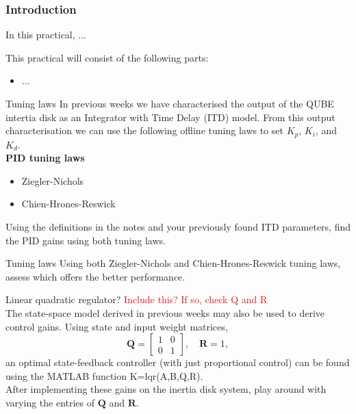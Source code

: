 \documentclass[9pt]{beamer-control}
\begin{document}

\begin{frame}
\frametitle{Introduction}
In this practical, ...

\vfill

This practical will consist of the following parts:
\begin{itemize}
\item ...
\end{itemize}
\end{frame}


\begin{frame}{Tuning laws}
In previous weeks we have characterised the output of the QUBE intertia disk as an Integrator with Time Delay (ITD) model. From this output characterisation we can use the following offline tuning laws to set $K_p$, $K_i$, and $K_d$.\\
\textbf{PID tuning laws}
\begin{itemize}
\item Ziegler-Nichols
\item Chien-Hrones-Reswick
\end{itemize}
Using the definitions in the notes and your previously found ITD parameters, find the PID gains using both tuning laws.
\end{frame}

\begin{frame}{Tuning laws}
Using both Ziegler-Nichols and Chien-Hrones-Reswick tuning laws, assess which offers the better performance.
\end{frame}


\begin{frame}{Linear quadratic regulator?}
\textcolor{red}{Include this? If so, check Q and R}\\
The state-space model derived in previous weeks may also be used to derive control gains. Using state and input weight matrices, 
\[ \mathbf{Q} = \begin{bmatrix}
	1 & 0 \\ 0 & 1
\end{bmatrix}, \quad \mathbf{R} = 1 ,\]
an optimal state-feedback controller (with just proportional control) can be found using the MATLAB function K=lqr(A,B,Q,R).\\
After implementing these gains on the inertia disk system, play around with varying the entries of $\mathbf{Q}$ and $\mathbf{R}$.

\end{frame}


\SUMMARYFRAME
\end{document}
